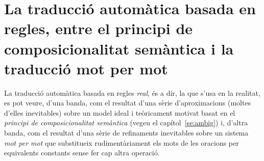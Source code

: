 

\section[La traducció automàtica real entre\ldots]{La traducció
  automàtica basada en regles, entre el principi de composicionalitat
  semàntica i la traducció mot per mot}
\label{se:aprox}

La traducció automàtica basada en regles \emph{real}, és a dir, la que
s'usa en la realitat, es pot veure, d'una banda, com el resultat d'una
sèrie d'aproximacions (moltes d'elles inevitables) sobre un model
ideal i teòricament motivat basat en el \emph{principi de
  composicionalitat semàntica} (vegeu el capítol~\ref{se:ambig}) i,
d'altra banda, com el resultat d'una sèrie de refinaments inevitables
sobre un sistema \emph{mot per mot} que substitueix rudimentàriament
els mots de les oracions per equivalents constants sense fer cap altra
operació.

